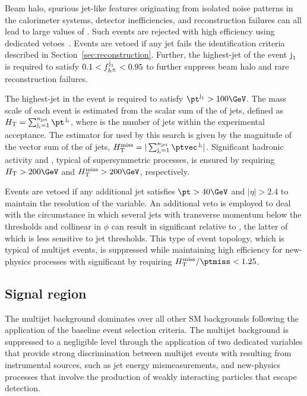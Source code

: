 Beam halo, spurious jet-like features originating from isolated noise
patterns in the calorimeter systems, detector inefficiencies, and
reconstruction failures can all lead to large values of \ptmiss. Such
events are rejected with high efficiency using dedicated
vetoes~\cite{CMS-PAS-JME-16-004, Khachatryan:2014gga}. Events are
vetoed if any jet fails the identification criteria described in
Section~\ref{sec:reconstruction}. Further, the highest-\pt jet of the
event $\text{j}_\text{1}$ is required to satisfy $0.1 < f_{h^{\pm}}^{\text{j}_\text{1}} <
0.95$ to further suppress beam halo and rare reconstruction failures.

The highest-\pt jet in the event is required to satisfy $\pt^{\jet{1}}
> 100\GeV$. The mass scale of each event is estimated from the scalar
sum of the \pt of jets, defined as $\scalht = \sum_{\jet{i} =
  1}^{\njet} \pt^{\,\jet{i}}$, where \njet is the number of jets
within the experimental acceptance. The estimator for \ptvecmiss used
by this search is given by the magnitude of the vector sum of the \pt
of jets, $\mht = |\sum_{\jet{i} = 1}^{\njet}
\ptvec^{\,\jet{i}}|$. Significant hadronic activity and \ptvecmiss,
typical of supersymmetric processes, is ensured by requiring $\scalht
> 200\GeV$ and $\mht > 200\GeV$, respectively.

Events are vetoed if any additional jet satisfies $\pt > 40\GeV$ and
$|\eta| > 2.4$ to maintain the resolution of the \mht variable.
An additional veto is employed to deal with the circumstance in which
several jets with transverse momentum below the \pt thresholds and
collinear in $\phi$ can result in significant \mht relative to
\ptmiss, the latter of which is less sensitive to jet thresholds. This
type of event topology, which is typical of multijet events, is
suppressed while maintaining high efficiency for new-physics processes
with significant \ptvecmiss by requiring $\mhtmet < 1.25$.


\subsection{Signal region}
\label{sec:signal}

The multijet background dominates over all other SM backgrounds
following the application of the baseline event selection
criteria. The multijet background is suppressed to a negligible level
through the application of two dedicated variables that provide strong
discrimination between multijet events with \ptvecmiss resulting from
instrumental sources, such as jet energy mismeasurements, and
new-physics processes that involve the production of weakly
interacting particles that escape detection.


